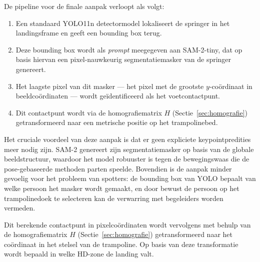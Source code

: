 De pipeline voor de finale aanpak verloopt als volgt:
\begin{enumerate}
    \item Een standaard YOLO11n detectormodel lokaliseert de springer in het landingsframe en geeft een bounding box terug.
    \item Deze bounding box wordt als \textit{prompt} meegegeven aan SAM-2-tiny, dat op basis hiervan een pixel-nauwkeurig segmentatiemasker van de springer genereert.
    \item Het laagste pixel van dit masker — het pixel met de grootste $y$-co{\"o}rdinaat in beeldco{\"o}rdinaten — wordt geïdentificeerd als het voetcontactpunt.
    \item Dit contactpunt wordt via de homografiematrix $H$ (Sectie~\ref{sec:homografie}) getransformeerd naar een metrische positie op het trampolinebed.
\end{enumerate}

Het cruciale voordeel van deze aanpak is dat er geen expliciete keypointpredities meer nodig zijn. SAM-2 genereert zijn segmentatiemasker op basis van de globale beeldstructuur, waardoor het model robuuster is tegen de bewegingswaas die de pose-gebaseerde methoden parten speelde. Bovendien is de aanpak minder gevoelig voor het probleem van spotters: de bounding box van YOLO bepaalt van welke persoon het masker wordt gemaakt, en door bewust de persoon op het trampolinedoek te selecteren kan de verwarring met begeleiders worden vermeden.

Dit berekende contactpunt in pixelco{\"o}rdinaten wordt vervolgens met behulp van de homografiematrix $H$ (Sectie~\ref{sec:homografie}) getransformeerd naar het co{\"o}rdinaat in het stelsel van de trampoline. Op basis van deze transformatie wordt bepaald in welke HD-zone de landing valt.
